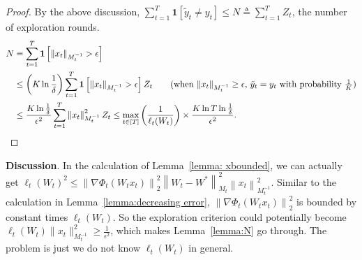 \documentclass{article}
\newcommand{\one}{\boldsymbol{1}}
\newcommand{\nb}{\nabla}
\newcommand{\norm}[1]{\left\|{#1}\right\|}
\begin{document}
\begin{proof}
By the above discussion, $\sum_{t=1}^T \one[\tilde{y}_t\neq y_t] \leq N\triangleq \sum_{t=1}^T Z_t$, the number of exploration rounds. 
\begin{align*}
    N &= \sum_{t=1}^T \one\left[\norm{x_t}_{M_t^{-1}}> \epsilon\right]\\
    &\leq \left(K\ln \frac{1}{\delta}\right)\sum_{t=1}^T \one\left[\norm{x_t}_{M_t^{-1}}> \epsilon\right]Z_t \tag{when $\|x_t\|_{M_t^{-1}}\geq \epsilon$, $\tilde{y}_t=y_t$ with probability $\frac{1}{K}$} \\
    & \leq \frac{K\ln \frac{1}{\delta}}{\epsilon^2}\sum_{t=1}^T \norm{x_t}_{M_t^{-1}}^2 Z_t \leq \max_{t\in[T]}\left(\frac{1}{\ell_{t}(W_t)}\right)\times \frac{K\ln T\ln \frac{1}{\delta}}{\epsilon^2}. 
\end{align*}
\end{proof}


\textbf{Discussion}. 
In the calculation of Lemma~\ref{lemma: xbounded},  we can actually get $\ell_t(W_t)^2 \leq \norm{\nb\Phi_t(W_tx_t)}_2^2\norm{W_t-W^*}_{M_t}^2\norm{x_t}_{M_t^{-1}}^2$. Similar to the calculation in Lemma~\ref{lemma:decreasing error}, $\norm{\nb\Phi_t(W_tx_t)}_2^2$ is bounded by constant times $\ell_t(W_t)$. So the exploration criterion could potentially become $\ell_t(W_t)\|x_t\|_{M_t^{-1}}^2\geq \frac{1}{\epsilon^2}$, which makes Lemma~\ref{lemma:N} go through. The problem is just we do not know $\ell_t(W_t)$ in general. 











\newpage
% 
%
\end{document}
